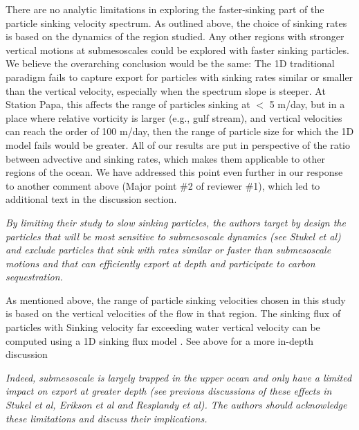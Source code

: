 \documentclass[12pt,letter]{article}
\begin{document}
{\color{blue}
	There are no analytic limitations in exploring the faster-sinking part of the particle sinking velocity spectrum. As outlined above, the choice of sinking rates is based on the dynamics of the region studied. Any other regions with stronger vertical motions at submesoscales could be explored with faster sinking particles. We believe the overarching conclusion would be the same: The 1D traditional paradigm fails to capture export for particles with sinking rates similar or smaller than the vertical velocity, especially when the spectrum slope is steeper. At Station Papa, this affects the range of particles sinking at $<$ 5 m/day, but in a place where relative vorticity is larger (e.g., gulf stream), and vertical velocities can reach the order of 100 m/day, then the range of particle size for which the 1D model fails would be greater. All of our results are put in perspective of the ratio between advective and sinking rates, which makes them applicable to other regions of the ocean. We have addressed this point even further in our response to another comment above (Major point \#2 of reviewer \#1), which led to additional text in the discussion section.\\}

\textit{By limiting their study to slow sinking particles, the authors target by design the particles that will be most sensitive to submesoscale dynamics (see Stukel et al) and exclude particles that sink with rates similar or faster than submesoscale motions and that can efficiently export at depth and participate to carbon sequestration.}

{\color{blue}
	As mentioned above, the range of particle sinking velocities chosen in this study is based on the vertical
	velocities of the flow in that region. The sinking flux of particles with Sinking velocity far exceeding water vertical velocity can be computed using a 1D sinking flux model \citep[e.g., ][]{Omand_2020}. See above for a more in-depth discussion\\}

 \textit{Indeed, submesoscale is largely trapped in the upper ocean and only have a limited impact on export at greater depth (see previous discussions of these effects in Stukel et al, Erikson et al and Resplandy et al). The authors should acknowledge these limitations and discuss their implications.\\}
\end{document}
